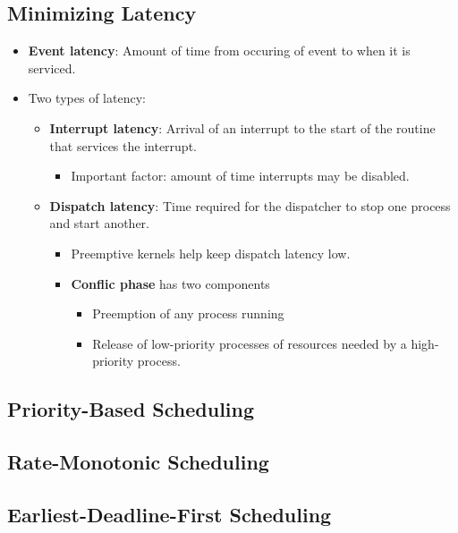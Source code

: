 \documentclass[10pt]{report}
\begin{document}
		\subsection{Minimizing Latency}
			\begin{itemize}
				\item \textbf{Event latency}: Amount of time from occuring of event to when it is serviced.
				\item Two types of latency:
				\begin{itemize}
					\item \textbf{Interrupt latency}: Arrival of an interrupt to the start of the routine that services the interrupt.
					\begin{itemize}
						\item Important factor: amount of time interrupts may be disabled.
					\end{itemize}
					\item \textbf{Dispatch latency}: Time required for the dispatcher to stop one process and start another.
					\begin{itemize}
						\item Preemptive kernels help keep dispatch latency low.
						\item \textbf{Conflic phase} has two components
						\begin{itemize}
							\item Preemption of any process running
							\item Release of low-priority processes of resources needed by a high-priority process.
						\end{itemize}
					\end{itemize}
				\end{itemize}
			\end{itemize}

		\subsection{Priority-Based Scheduling}

		\subsection{Rate-Monotonic Scheduling}

		\subsection{Earliest-Deadline-First Scheduling}
\end{document}
